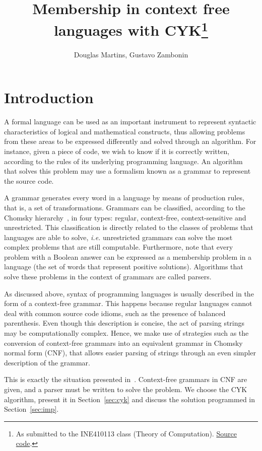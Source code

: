 \documentclass[12pt]{article}
\title{Membership in context free languages with CYK\footnote{
    As submitted to the INE410113 class (Theory of Computation).
    \href{https://github.com/zambonin/ine410113}{Source code}.}}
\author{Douglas Martins\inst{1}, Gustavo Zambonin\inst{1}}
\begin{document}
\maketitle

\section{Introduction}\label{sec:intro}

A formal language can be used as an important instrument to represent syntactic
characteristics of logical and mathematical constructs, thus allowing problems
from these areas to be expressed differently and solved through an algorithm.
For instance, given a piece of code, we wish to know if it is correctly
written, according to the rules of its underlying programming language. An
algorithm that solves this problem may use a formalism known as a grammar to
represent the source code.

A grammar generates every word in a language by means of production rules, that
is, a set of transformations. Grammars can be classified, according to the
Chomsky hierarchy~\cite{Chomsky:article:1959:jun}, in four types: regular,
context-free, context-sensitive and unrestricted. This classification is
directly related to the classes of problems that languages are able to solve,
\emph{i.e.} unrestricted grammars can solve the most complex problems that are
still computable. Furthermore, note that every problem with a Boolean answer
can be expressed as a membership problem in a language (the set of words that
represent positive solutions). Algorithms that solve these problems in the
context of grammars are called parsers.

As discussed above, syntax of programming languages is usually described in the
form of a context-free grammar. This happens because regular languages cannot
deal with common source code idioms, such as the presence of balanced
parenthesis. Even though this description is concise, the act of parsing
strings may be computationally complex. Hence, we make use of strategies such
as the conversion of context-free grammars into an equivalent grammar in
Chomsky normal form (CNF), that allows easier parsing of strings through an
even simpler description of the grammar.

This is exactly the situation presented in~\cite{Guimaraes:misc:2007:sep}.
Context-free grammars in CNF are given, and a parser must be written to solve
the problem. We choose the CYK algorithm, present it in Section~\ref{sec:cyk}
and discuss the solution programmed in Section~\ref{sec:imp}.
\end{document}
